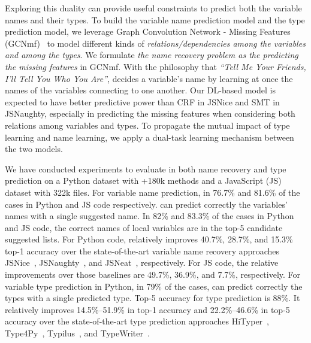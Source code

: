 %

Exploring this duality can provide useful constraints to predict both
the variable names and their types.  To build the variable name
prediction model and the type prediction model, we leverage Graph
Convolution Network - Missing Features (GCNmf)~\cite{GCNmf} to model
different kinds of {\em relations/dependencies among the variables and
  among the types}. We formulate {\em the name recovery problem as the
  predicting the missing features} in GCNmf. 
%
With the philosophy that {\em ``Tell Me Your Friends, I'll Tell You Who
  You Are''}, {\tool} decides a variable's name by learning at once
the names of the variables connecting to one another.
%
Our DL-based model is expected to have better predictive power than
CRF in JSNice and SMT in JSNaughty, especially in predicting the
missing features when considering both relations among variables and
types. To propagate the mutual
impact of type learning and name learning, we apply a dual-task
learning mechanism between the two models.

We have conducted experiments to evaluate {\tool} in both name
recovery and type prediction on a Python dataset with +180k methods
and a JavaScript (JS) dataset with 322k files.
For variable name prediction, in 76.7\% and 81.6\%
of the cases in Python and JS code respectively.
{\tool} can predict correctly the variables' names with a single
suggested name. In 82\% and 83.3\%
of the cases in Python and JS code,
the correct names of local variables are in the top-5 candidate
suggested lists. For Python code, {\tool} relatively improves 40.7\%,
28.7\%, and 15.3\% top-1 accuracy over the state-of-the-art variable
name recovery approaches JSNice~\cite{JSNice2015},
JSNaughty~\cite{JSNaughty2017}, and JSNeat~\cite{icse19},
respectively. For JS code, the relative improvements over those
baselines are 49.7\%, 36.9\%, and 7.7\%, respectively.
%
%
For variable type prediction in Python, in 79\% of the cases, {\tool}
can predict correctly the types with a single predicted type. Top-5
accuracy for type prediction is 88\%. It relatively improves
14.5\%--51.9\% in top-1 accuracy and 22.2\%--46.6\% in top-5 accuracy
over the state-of-the-art type prediction approaches
HiTyper~\cite{HiTyper-icse22}, Type4Py~\cite{Type4Py-icse22},
Typilus~\cite{typilus-pldi20}, and TypeWriter~\cite{typewriter-fse20}.

